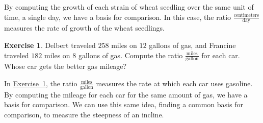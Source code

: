 \documentclass[10pt,]{book}
\theoremstyle{plain}
\theoremstyle{definition}
\theoremstyle{definition}
\theoremstyle{definition}
\theoremstyle{definition}
\newtheorem{exercise}[theorem]{Exercise}
\numberwithin{equation}{part}
\begin{document}
By computing the growth of each strain of wheat seedling over the same unit of time, a single day, we have a basis for comparison. In this case, the ratio \(\frac{\text{centimeters}}{\text{day}}\) measures the rate of growth of the wheat seedlings.%
\begin{exercise}\label{exercise-gas-mileage}
Delbert traveled \(258\) miles on \(12\) gallons of gas, and Francine traveled \(182\) miles on \(8\) gallons of gas. Compute the ratio \(\frac{\text{miles}}{\text{gallon}}\) for each car. Whose car gets the better gas mileage?%
\end{exercise}
In \hyperref[exercise-gas-mileage]{Exercise~\ref{exercise-gas-mileage}}, the ratio \(\frac{\text{miles}}{\text{gallon}}\) measures the rate at which each car uses gasoline. By computing the mileage for each car for the same amount of gas, we have a basis for comparison. We can use this same idea, finding a common basis for comparison, to measure the steepness of an incline.%
\typeout{************************************************}
\typeout{************************************************}
\end{document}
